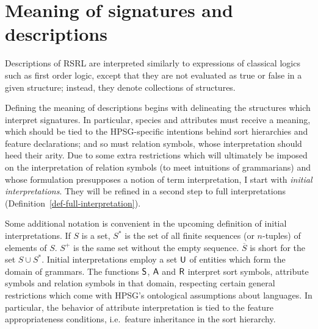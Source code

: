 \documentclass[output=paper,biblatex,babelshorthands,newtxmath,draftmode,colorlinks,citecolor=brown]{langscibook}
\begin{document}
{\section{Meaning of signatures and descriptions}
\label{sec-meaning}

Descriptions of RSRL are interpreted similarly to expressions of
classical logics such as first order logic, except that they are not
evaluated as true or false in a given structure; instead, they denote
collections of structures.

Defining the meaning of descriptions begins with delineating the
structures which interpret signatures. In particular, species and
attributes must receive a meaning, which should be tied to the
HPSG-specific intentions behind sort hierarchies and feature
declarations; and so must relation symbols, whose interpretation
should heed their arity. Due to some extra restrictions which will
ultimately be imposed on the interpretation of relation symbols (to meet
intuitions of grammarians) and whose
formulation presupposes a notion of term interpretation, I start with
\emph{initial interpretations}. They will be refined in a second
step to full interpretations (Definition~\ref{def-full-interpretation}).

Some additional notation is convenient in the upcoming definition of
initial interpretations. If $S$ is a
set, $S^{*}$ is the set of all finite sequences (or $n$-tuples) of elements
of $S$. $S^{+}$ is the same set without the empty sequence. $\overline{S}$
is short for the set $S\cup S^{*}$. Initial interpretations employ a set
$\mathsf{U}$ of entities which form the domain of grammars. The functions
$\mathsf{S}$, $\mathsf{A}$ and $\mathsf{R}$ interpret sort symbols, attribute symbols
and relation symbols in that domain, respecting certain general restrictions which come with
HPSG's ontological assumptions about languages. In particular, the behavior of
attribute interpretation is tied to the feature appropriateness conditions,
i.e.\ feature inheritance in the sort hierarchy.

}
\end{document}
